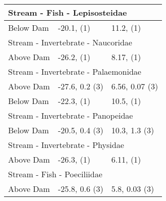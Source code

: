 \documentclass[
]{article}
\begin{document}
\begin{longtable}{lll}
\midrule
\multicolumn{3}{l}{Stream - Fish - Lepisosteidae} \\ 
\midrule
Below Dam & -20.1,     (1) & 11.2,     (1) \\ 
\midrule
\multicolumn{3}{l}{Stream - Invertebrate - Naucoridae} \\ 
\midrule
Above Dam & -26.2,     (1) & 8.17,     (1) \\ 
\midrule
\multicolumn{3}{l}{Stream - Invertebrate - Palaemonidae} \\ 
\midrule
Above Dam & -27.6, 0.2 (3) & 6.56, 0.07 (3) \\ 
Below Dam & -22.3,     (1) & 10.5,     (1) \\ 
\midrule
\multicolumn{3}{l}{Stream - Invertebrate - Panopeidae} \\ 
\midrule
Below Dam & -20.5, 0.4 (3) & 10.3, 1.3 (3) \\ 
\midrule
\multicolumn{3}{l}{Stream - Invertebrate - Physidae} \\ 
\midrule
Above Dam & -26.3,     (1) & 6.11,     (1) \\ 
\midrule
\multicolumn{3}{l}{Stream - Fish - Poeciliidae} \\ 
Above Dam & -25.8, 0.6 (3) & 5.8, 0.03 (3) \\ 
\bottomrule
\end{longtable}
\end{document}
